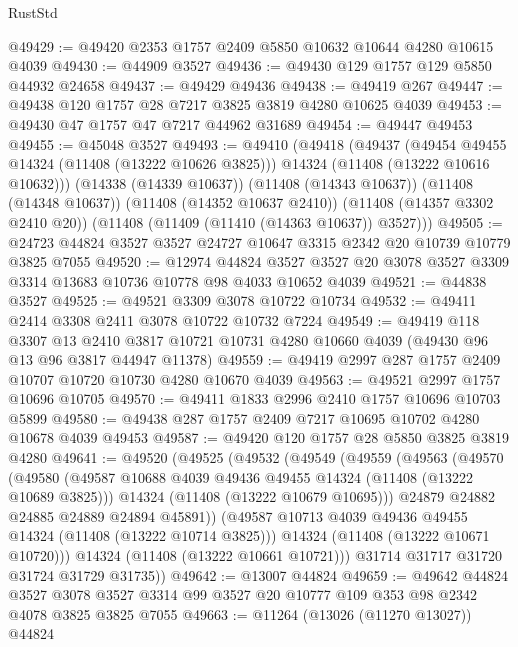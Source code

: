 \begin{lexlean}{RustStd}
\begin{coremodule}
@49429 := @49420 @2353 @1757 @2409 @5850 @10632 @10644 @4280 @10615 @4039
@49430 := @44909 @3527
@49436 := @49430 @129 @1757 @129 @5850 @44932 @24658
@49437 := @49429 @49436
@49438 := @49419 @267
@49447 := @49438 @120 @1757 @28 @7217 @3825 @3819 @4280 @10625 @4039
@49453 := @49430 @47 @1757 @47 @7217 @44962 @31689
@49454 := @49447 @49453
@49455 := @45048 @3527
@49493 := @49410
    (@49418
      (@49437
        (@49454 @49455 @14324 (@11408 (@13222 @10626 @3825)))
        @14324
        (@11408 (@13222 @10616 @10632)))
      (@14338 (@14339 @10637))
      (@11408 (@14343 @10637))
      (@11408 (@14348 @10637))
      (@11408 (@14352 @10637 @2410))
      (@11408 (@14357 @3302 @2410 @20))
      (@11408 (@11409 (@11410 (@14363 @10637)) @3527)))
@49505 := @24723 @44824 @3527 @3527 @24727 @10647 @3315 @2342 @20 @10739 @10779 @3825 @7055
@49520 := @12974
    @44824
    @3527
    @3527
    @20
    @3078
    @3527
    @3309
    @3314
    @13683
    @10736
    @10778
    @98
    @4033
    @10652
    @4039
@49521 := @44838 @3527
@49525 := @49521 @3309 @3078 @10722 @10734
@49532 := @49411 @2414 @3308 @2411 @3078 @10722 @10732 @7224
@49549 := @49419
    @118
    @3307
    @13
    @2410
    @3817
    @10721
    @10731
    @4280
    @10660
    @4039
    (@49430 @96 @13 @96 @3817 @44947 @11378)
@49559 := @49419 @2997 @287 @1757 @2409 @10707 @10720 @10730 @4280 @10670 @4039
@49563 := @49521 @2997 @1757 @10696 @10705
@49570 := @49411 @1833 @2996 @2410 @1757 @10696 @10703 @5899
@49580 := @49438 @287 @1757 @2409 @7217 @10695 @10702 @4280 @10678 @4039 @49453
@49587 := @49420 @120 @1757 @28 @5850 @3825 @3819 @4280
@49641 := @49520
    (@49525
      (@49532
        (@49549
          (@49559
            (@49563
              (@49570
                (@49580
                  (@49587 @10688 @4039 @49436 @49455 @14324 (@11408 (@13222 @10689 @3825)))
                  @14324
                  (@11408 (@13222 @10679 @10695)))
                @24879
                @24882
                @24885
                @24889
                @24894
                @45891))
            (@49587 @10713 @4039 @49436 @49455 @14324 (@11408 (@13222 @10714 @3825)))
            @14324
            (@11408 (@13222 @10671 @10720)))
          @14324
          (@11408 (@13222 @10661 @10721)))
        @31714
        @31717
        @31720
        @31724
        @31729
        @31735))
@49642 := @13007 @44824
@49659 := @49642
    @44824
    @3527
    @3078
    @3527
    @3314
    @99
    @3527
    @20
    @10777
    @109
    @353
    @98
    @2342
    @4078
    @3825
    @3825
    @7055
@49663 := @11264 (@13026 (@11270 @13027)) @44824

\end{coremodule}
\end{lexlean}
